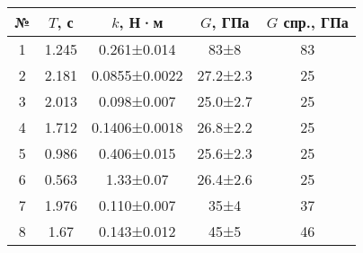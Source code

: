 \begin{tabular}{|c|c|c|c|c|}
\hline
№ & $T$, с & $k$, Н·м & $G$, ГПа & $G$ спр., ГПа \\ \hline
1 & 1.245 & 0.261±0.014 & 83±8 & 83 \\ \hline
2 & 2.181 & 0.0855±0.0022 & 27.2±2.3 & 25 \\ \hline
3 & 2.013 & 0.098±0.007 & 25.0±2.7 & 25 \\ \hline
4 & 1.712 & 0.1406±0.0018 & 26.8±2.2 & 25 \\ \hline
5 & 0.986 & 0.406±0.015 & 25.6±2.3 & 25 \\ \hline
6 & 0.563 & 1.33±0.07 & 26.4±2.6 & 25 \\ \hline
7 & 1.976 & 0.110±0.007 & 35±4 & 37 \\ \hline
8 & 1.67 & 0.143±0.012 & 45±5 & 46 \\ \hline
\end{tabular}